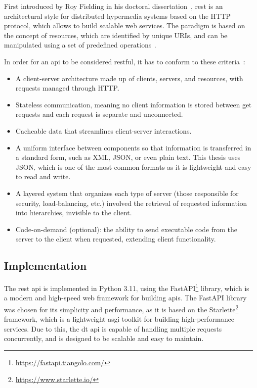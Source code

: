 First introduced by Roy Fielding in his doctoral dissertation~\parencite{fieldingArchitecturalStylesDesign2000}, \acrshort{rest} is an architectural style for distributed hypermedia systems based on the HTTP protocol, which allows to build scalable web services. The paradigm is based on the concept of resources, which are identified by unique URIs, and can be manipulated using a set of predefined operations~\parencite{framlingProductAgentsHandling2003}.

In order for an \acrshort{api} to be considered \acrshort{rest}ful, it has to conform to these criteria~\parencite{redhatinc.WhatRESTAPI2020,fieldingArchitecturalStylesDesign2000}:
\begin{itemize}
    \item A client-server architecture made up of clients, servers, and resources, with requests managed through HTTP.
    \item Stateless communication, meaning no client information is stored between get requests and each request is separate and unconnected.
    \item Cacheable data that streamlines client-server interactions.
    \item A uniform interface between components so that information is transferred in a standard form, such as XML, JSON, or even plain text. This thesis uses JSON, which is one of the most common formats as it is lightweight and easy to read and write.
    \item A layered system that organizes each type of server (those responsible for security, load-balancing, etc.) involved the retrieval of requested information into hierarchies, invisible to the client.
    \item Code-on-demand (optional): the ability to send executable code from the server to the client when requested, extending client functionality. 
\end{itemize}

\subsection{Implementation}

The \acrshort{rest} \acrshort{api} is implemented in Python 3.11, using the FastAPI\footnote{\url{https://fastapi.tiangolo.com/}} library, which is a modern and high-speed web framework for building \acrshort{api}s. The FastAPI library was chosen for its simplicity and performance, as it is based on the Starlette\footnote{\url{https://www.starlette.io/}} framework, which is a lightweight \acrfull{asgi} toolkit for building high-performance services. Due to this, the \acrshort{dt} \acrshort{api} is capable of handling multiple requests concurrently, and is designed to be scalable and easy to maintain.

